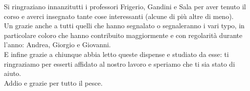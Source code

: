 Si ringraziano innanzitutti i professori Frigerio, Gandini e Sala per aver tenuto il corso e averci insegnato tante cose interessanti (alcune di più altre di meno). \\
Un grazie anche a tutti quelli che hanno segnalato o segnaleranno i vari typo, in particolare coloro che hanno contribuito maggiormente e con regolarità durante l'anno: Andrea, Giorgio e Giovanni. \\
E infine grazie a chiunque abbia letto queste dispense e studiato da esse: ti ringraziamo per esserti affidato al nostro lavoro e speriamo che ti sia stato di aiuto. \\
Addio e grazie per tutto il pesce.
